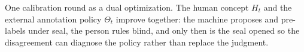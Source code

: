 \begin{algorithm}[H]

\caption{One calibration round as a dual optimization. The human concept $H_t$ and the
  external annotation policy $\Theta_t$ improve together: the machine proposes and
  pre-labels under seal, the person rules blind, and only then is the seal opened so the
  disagreement can diagnose the policy rather than replace the judgment.}
\label{alg:qa0-dual-optimization}
\end{algorithm}
